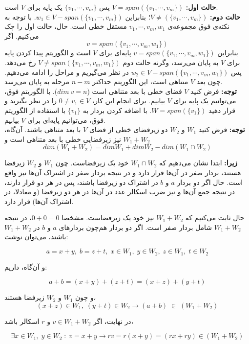 \textbf{حالت اول:}
$V=span(\{v_1,\cdots,v_m\})$ پس $\{v_1,\cdots,v_m\}$ یک پایه برای $V$ است.\\
\textbf{حالت دوم:}
$V\neq (\{v_1,\cdots,v_m\})$؛ بنابراین $w_1\in V-span(\{v_1,\cdots,v_m\})$. با توجه به نکته‌ی فوق مجموعه‌ی $v_1,\cdots,v_m,w_1$ مستقل خطی است. حال، حالت اول را چک می‌کنیم. اگر $$v=span(\{v_1,\cdots,v_m,w_1\})$$
بنابراین $v=span(\{v_1,\cdots,v_m,w_1\})$ پایه‌ای برای $V$ است و الگوریتم پیدا کردن پایه برای $V$ به پایان می‌رسد، وگرنه حالت دوم $V\neq span(\{v_1,\cdots,v_m,w_1\})$ رخ می‌دهد. پس $w_2\in V-span(\{v_1,\cdots,v_m,w_1\})$ در نظر می‌گیریم و مراحل را ادامه می‌دهیم. چون بعد $V$ متناهی است، این الگوریتم حداکثر $n-m$ مرحله به پایان می‌رسد.\\
\textbf{توجه: }
فرض کنید $V$ فضا‌ی خطی با بعد متناهی است ($dim\:v=n$). با الگوریتم فوق، می‌توانیم یک پایه برای $V$ بیابیم. برای انجام این کار، $0\neq v_1 \in V$ را در نظر بگیرید و قرار دهید $W=span(\{v_1\})$. با اضافه کردن بردار به $\{v_1\}$ با استفاده از الگوریتم فوق، می‌توانیم پایه‌ای برای $V$ بیابیم.\\

\textbf{توجه: }
فرض کنید $W_1$ و $W_2$ دو زیرفضای خطی از فضای $V$ با بعد متناهی باشند. آن‌گاه، $W_1 + W_2$ نیز زیرفضایی خطی با بعد متناهی است و
$$ dim(W_1 + W_2) = dim W_1 + dim W_2 - dim(W_1 \cap W_2)$$

\textbf{زیرا:}
ابتدا نشان می‌دهیم که $W_1 \cap W_2$ خود یک زیرفضاست. چون $W_1$ و $W_2$ زیرفضا هستند، بردار صفر در آن‌ها قرار دارد و در نتیجه بردار صفر در اشتراک آن‌ها نیز واقع است. حال اگر دو بردار $a$ و $b$ در اشتراک دو زیرفضا باشند، پس در هر دو قرار دارند، در نتیجه جمع آن‌ها و نیز ضرب اسکالر عدد در آن‌ها در هر دو زیرفضا (و معادلا، در اشتراک آن‌ها) قرار دارد.

حال ثابت می‌کنیم که $W_1 + W_2$ نیز خود یک زیرفضاست. مشخصا $0+0=0$، در نتیجه $W_1 + W_2$ شامل بردار صفر است. اگر دو بردار هم‌چون بردارهای $a$ و $b$ در $W_1 + W_2$ باشند، می‌توان نوشت:

$$ a = x + y, \; b = z + t, \; x \in W_1, \; y \in W_2, \; z \in W_1, \; t \in W_2$$

و آن‌گاه، داریم:

$$ a + b = (x + y) + (z + t) = (x + z) + (y + t) $$

و چون $W_1$ و $W_2$ زیرفضا هستند، 
$$ (x + z) \in W_1 ,\; (y + t) \in W_2 \to (a + b) \; \in \; (W_1 + W_2)$$

در نهایت، اگر $v \in W_1 + W_2$ و $r$ اسکالر باشد،

$$ \exists x \in W_1 , \; y \in W_2 \; : \; v = x + y \to rv = r(x+y) = (rx + ry) \in (W_1 + W_2) $$

